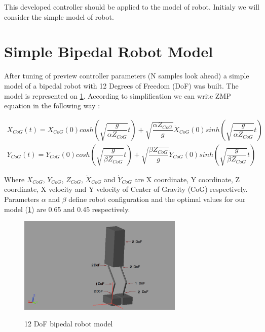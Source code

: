 \documentclass[12pt,a4paper]{report}
\begin{document}
				This developed controller should be applied to the model of robot. Initialy we will consider the simple model of robot.
		\section{Simple Bipedal Robot Model}
			After tuning of preview controller parameters (N samples look ahead) a simple model of a bipedal robot with 12 Degrees of Freedom (DoF) was built. The model is represented on \cref{fig:21}. According to simplification we can write ZMP equation in the following way \cite{ha2007effective}: 
			
			\begin{equation}\label{eq:CoG1}
				\begin{split}
					X_{CoG}(t) = X_{CoG}(0) cosh \left( \sqrt{\dfrac{g}{\alpha Z_{CoG}}} t \right) + \sqrt{\dfrac{\alpha Z_{CoG}}{g}} \dot{X}_{CoG}(0) sinh\left(\sqrt{\dfrac{g}{\alpha Z_{CoG}} } t\right)\\
					Y_{CoG}(t) = Y_{CoG}(0) cosh \left( \sqrt{\dfrac{g}{\beta Z_{CoG}}} t \right) + \sqrt{\dfrac{\beta Z_{CoG}}{g}} \dot{Y}_{CoG}(0) sinh \left( \sqrt{\dfrac{g}{\beta Z_{CoG}}} t \right)
				\end{split}
			\end{equation}
			
			Where $X_{CoG}$, $Y_{CoG}$,  $Z_{CoG}$, $\dot{X}_{CoG}$ and $\dot{Y}_{CoG}$ are X coordinate, Y coordinate, Z coordinate, X velocity and Y velocity of Center of Gravity (CoG) respectively. Parameters $\alpha$ and $\beta$ define robot configuration and the optimal values for our model (\cref{fig:21}) are 0.65 and 0.45 respectively.
			
			\begin{figure}[H]
				\vspace{-0.2cm}
				\centering
				{\includegraphics[width=0.7\textwidth]{21}}
				\caption{12 DoF bipedal robot model}
				\label{fig:21}
				\vspace{-0.1cm}
			\end{figure}
			
\end{document}
